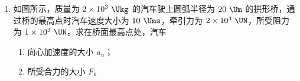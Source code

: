 \documentclass[\gkver]{gaokaozhenti}
\begin{document}
\begin{enumerate}
{解得 $Q = -W$。

负号表示过程中气体放出热量 $W$。

（2）理想气体经历从 A 状态到 B 状态等温变化，由玻意耳定律有 $p_{0}V_{0} = pV$。

解得 $p = \frac{V_{0}}{V}p_{0}$。
}

\item
如图所示，质量为 $2\times10^{3}\ \Ukg$ 的汽车驶上圆弧半径为 $20\ \Um$ 的拱形桥，通过桥的最高点时汽车速度大小为 $10\ \Ums$，牵引力为 $2\times10^{3}\ \UN$，所受阻力为 $1\times10^{3}\ \UN$。求在桥面最高点处，汽车
\begin{enumerate}
	\item
	向心加速度的大小 $a_{n}$；
	\item
	所受合力的大小 $F$。
\end{enumerate}


\end{enumerate}
\end{document}
